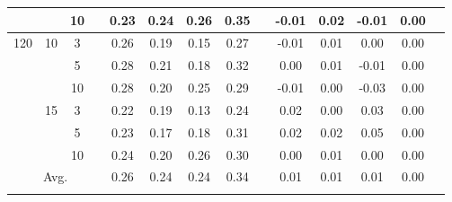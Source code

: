 \documentclass[a4paper,11pt,oneside,openany]{jsbook}
\newcommand{\bhline}[1]{\noalign{\hrule height #1}}
\begin{document}
\begin{table}[tb]
\begin{center}
\begin{tabular}{cccccccccccccc}
&    & 10 && 0.23 & 0.24 & 0.26 & 0.35 && -0.01 & 0.02 & -0.01 & 0.00\\
\hline
120 & 10 & 3  && 0.26 & 0.19 & 0.15 & 0.27 && -0.01 & 0.01 & 0.00  & 0.00 \\
    &    & 5  && 0.28 & 0.21 & 0.18 & 0.32 && 0.00  & 0.01 & -0.01 & 0.00 \\
    &    & 10 && 0.28 & 0.20 & 0.25 & 0.29 && -0.01 & 0.00 & -0.03 & 0.00\\
\cline{2-14}
& 15 & 3  && 0.22 & 0.19 & 0.13 & 0.24 && 0.02 & 0.00 & 0.03 & 0.00 \\
&    & 5  && 0.23 & 0.17 & 0.18 & 0.31 && 0.02 & 0.02 & 0.05 & 0.00 \\
&    & 10 && 0.24 & 0.20 & 0.26 & 0.30 && 0.00 & 0.01 & 0.00 & 0.00 \\
\hline
\multicolumn{4}{c}{Avg.}   &  0.26 & 0.24 & 0.24 & 0.34 &  & 0.01 & 0.01 & 0.01 & 0.00 & \\
\bhline{1pt}
\end{tabular}
\label{parameters_recovery1}
\end{center}
\end{table}
\end{document}
